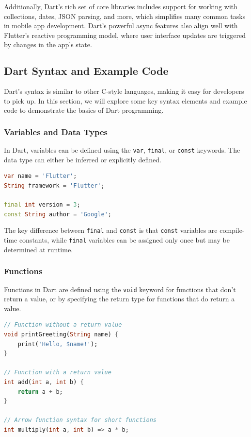 \documentclass[12pt,a4paper]{report}
\begin{document}
Additionally, Dart’s rich set of core libraries includes support for working with collections, dates, JSON parsing, and more, which simplifies many common tasks in mobile app development. Dart’s powerful async features also align well with Flutter’s reactive programming model, where user interface updates are triggered by changes in the app’s state.

\subsection{Dart Syntax and Example Code}

Dart’s syntax is similar to other C-style languages, making it easy for developers to pick up. In this section, we will explore some key syntax elements and example code to demonstrate the basics of Dart programming.

\subsubsection{Variables and Data Types}
In Dart, variables can be defined using the \texttt{var}, \texttt{final}, or \texttt{const} keywords. The data type can either be inferred or explicitly defined.

\begin{lstlisting}[language=Dart, caption={Dart Variables and Data Types}]
var name = 'Flutter';
String framework = 'Flutter';

final int version = 3;
const String author = 'Google';
\end{lstlisting}

The key difference between \texttt{final} and \texttt{const} is that \texttt{const} variables are compile-time constants, while \texttt{final} variables can be assigned only once but may be determined at runtime.

\subsubsection{Functions}
Functions in Dart are defined using the \texttt{void} keyword for functions that don’t return a value, or by specifying the return type for functions that do return a value.

\begin{lstlisting}[language=Dart, caption={Functions in Dart}]
// Function without a return value
void printGreeting(String name) {
    print('Hello, $name!');
}

// Function with a return value
int add(int a, int b) {
    return a + b;
}

// Arrow function syntax for short functions
int multiply(int a, int b) => a * b;
\end{lstlisting}
\end{document}
